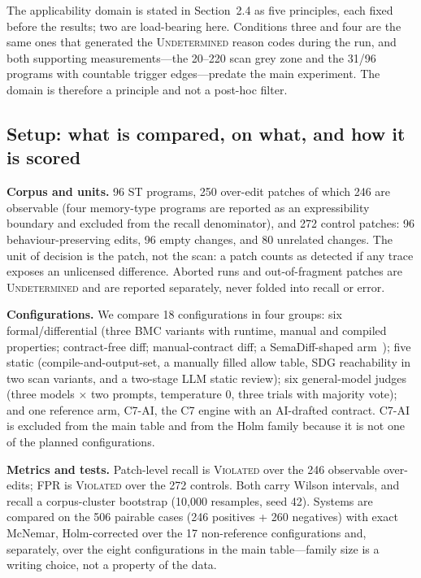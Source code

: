 \documentclass[acmsmall,screen,review,anonymous]{acmart}
\begin{document}
The applicability domain is stated in Section~2.4 as five principles, each fixed before the results; two are load-bearing here. Conditions three and four are the same ones that generated the \textsc{Undetermined} reason codes during the run, and both supporting measurements---the 20--220 scan grey zone and the 31/96 programs with countable trigger edges---predate the main experiment. The domain is therefore a principle and not a post-hoc filter.

\subsection{Setup: what is compared, on what, and how it is scored}

\textbf{Corpus and units.} 96 ST programs, 250 over-edit patches of which 246 are observable (four memory-type programs are reported as an expressibility boundary and excluded from the recall denominator), and 272 control patches: 96 behaviour-preserving edits, 96 empty changes, and 80 unrelated changes. The unit of decision is the patch, not the scan: a patch counts as detected if any trace exposes an unlicensed difference. Aborted runs and out-of-fragment patches are \textsc{Undetermined} and are reported separately, never folded into recall or error.

\textbf{Configurations.} We compare 18 configurations in four groups: six formal\slash differential (three BMC variants with runtime, manual and compiled properties; contract-free diff; manual-contract diff; a SemaDiff-shaped arm~\citep{semadiff}); five static (compile-and-output-set, a manually filled allow table, SDG reachability in two scan variants, and a two-stage LLM static review); six general-model judges (three models $\times$ two prompts, temperature 0, three trials with majority vote); and one reference arm, C7-AI, the C7 engine with an AI-drafted contract. C7-AI is excluded from the main table and from the Holm family because it is not one of the planned configurations.

\textbf{Metrics and tests.} Patch-level recall is \textsc{Violated} over the 246 observable over-edits; FPR is \textsc{Violated} over the 272 controls. Both carry Wilson intervals, and recall a corpus-cluster bootstrap (10,000 resamples, seed 42). Systems are compared on the 506 pairable cases (246 positives + 260 negatives) with exact McNemar, Holm-corrected over the 17 non-reference configurations and, separately, over the eight configurations in the main table---family size is a writing choice, not a property of the data.
\end{document}

